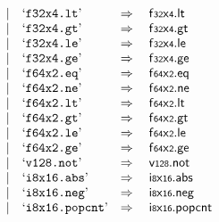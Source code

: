 $$\begin{array}[t]{@{}lrrl@{}l@{}l@{}l@{}}
& & | & \mbox{‘\texttt{f32x4.lt}’} & \quad\Rightarrow\quad{} & {\mathsf{f{\scriptstyle 32}}}{\mathsf{x}}{\mathsf{{\scriptstyle 4}}} {.} \mathsf{lt} \\
& & | & \mbox{‘\texttt{f32x4.gt}’} & \quad\Rightarrow\quad{} & {\mathsf{f{\scriptstyle 32}}}{\mathsf{x}}{\mathsf{{\scriptstyle 4}}} {.} \mathsf{gt} \\
& & | & \mbox{‘\texttt{f32x4.le}’} & \quad\Rightarrow\quad{} & {\mathsf{f{\scriptstyle 32}}}{\mathsf{x}}{\mathsf{{\scriptstyle 4}}} {.} \mathsf{le} \\
& & | & \mbox{‘\texttt{f32x4.ge}’} & \quad\Rightarrow\quad{} & {\mathsf{f{\scriptstyle 32}}}{\mathsf{x}}{\mathsf{{\scriptstyle 4}}} {.} \mathsf{ge} \\
& & | & \mbox{‘\texttt{f64x2.eq}’} & \quad\Rightarrow\quad{} & {\mathsf{f{\scriptstyle 64}}}{\mathsf{x}}{\mathsf{{\scriptstyle 2}}} {.} \mathsf{eq} \\
& & | & \mbox{‘\texttt{f64x2.ne}’} & \quad\Rightarrow\quad{} & {\mathsf{f{\scriptstyle 64}}}{\mathsf{x}}{\mathsf{{\scriptstyle 2}}} {.} \mathsf{ne} \\
& & | & \mbox{‘\texttt{f64x2.lt}’} & \quad\Rightarrow\quad{} & {\mathsf{f{\scriptstyle 64}}}{\mathsf{x}}{\mathsf{{\scriptstyle 2}}} {.} \mathsf{lt} \\
& & | & \mbox{‘\texttt{f64x2.gt}’} & \quad\Rightarrow\quad{} & {\mathsf{f{\scriptstyle 64}}}{\mathsf{x}}{\mathsf{{\scriptstyle 2}}} {.} \mathsf{gt} \\
& & | & \mbox{‘\texttt{f64x2.le}’} & \quad\Rightarrow\quad{} & {\mathsf{f{\scriptstyle 64}}}{\mathsf{x}}{\mathsf{{\scriptstyle 2}}} {.} \mathsf{le} \\
& & | & \mbox{‘\texttt{f64x2.ge}’} & \quad\Rightarrow\quad{} & {\mathsf{f{\scriptstyle 64}}}{\mathsf{x}}{\mathsf{{\scriptstyle 2}}} {.} \mathsf{ge} \\
& & | & \mbox{‘\texttt{v128.not}’} & \quad\Rightarrow\quad{} & \mathsf{v{\scriptstyle 128}} {.} \mathsf{not} \\
& & | & \mbox{‘\texttt{i8x16.abs}’} & \quad\Rightarrow\quad{} & {\mathsf{i{\scriptstyle 8}}}{\mathsf{x}}{\mathsf{{\scriptstyle 16}}} {.} \mathsf{abs} \\
& & | & \mbox{‘\texttt{i8x16.neg}’} & \quad\Rightarrow\quad{} & {\mathsf{i{\scriptstyle 8}}}{\mathsf{x}}{\mathsf{{\scriptstyle 16}}} {.} \mathsf{neg} \\
& & | & \mbox{‘\texttt{i8x16.popcnt}’} & \quad\Rightarrow\quad{} & {\mathsf{i{\scriptstyle 8}}}{\mathsf{x}}{\mathsf{{\scriptstyle 16}}} {.} \mathsf{popcnt} \\

\end{array}$$
